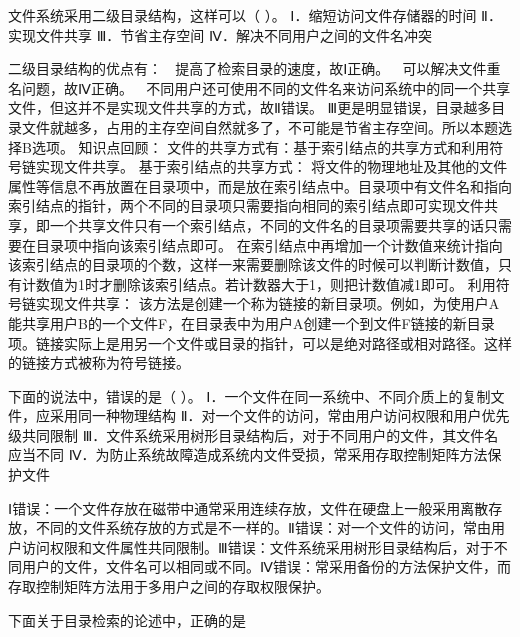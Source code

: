 \question 文件系统采用二级目录结构，这样可以（ ）。 Ⅰ．缩短访问文件存储器的时间
Ⅱ．实现文件共享 Ⅲ．节省主存空间 Ⅳ．解决不同用户之间的文件名冲突
\par{}
\begin{solution}二级目录结构的优点有：  提高了检索目录的速度，故Ⅰ正确。 
可以解决文件重名问题，故Ⅳ正确。 
不同用户还可使用不同的文件名来访问系统中的同一个共享文件，但这并不是实现文件共享的方式，故Ⅱ错误。
Ⅲ更是明显错误，目录越多目录文件就越多，占用的主存空间自然就多了，不可能是节省主存空间。所以本题选择B选项。
知识点回顾：
文件的共享方式有：基于索引结点的共享方式和利用符号链实现文件共享。
基于索引结点的共享方式：
将文件的物理地址及其他的文件属性等信息不再放置在目录项中，而是放在索引结点中。目录项中有文件名和指向索引结点的指针，两个不同的目录项只需要指向相同的索引结点即可实现文件共享，即一个共享文件只有一个索引结点，不同的文件名的目录项需要共享的话只需要在目录项中指向该索引结点即可。
在索引结点中再增加一个计数值来统计指向该索引结点的目录项的个数，这样一来需要删除该文件的时候可以判断计数值，只有计数值为1时才删除该索引结点。若计数器大于1，则把计数值减1即可。
利用符号链实现文件共享：
该方法是创建一个称为链接的新目录项。例如，为使用户A能共享用户B的一个文件F，在目录表中为用户A创建一个到文件F链接的新目录项。链接实际上是用另一个文件或目录的指针，可以是绝对路径或相对路径。这样的链接方式被称为符号链接。
\end{solution}
\question 下面的说法中，错误的是（ ）。
Ⅰ．一个文件在同一系统中、不同介质上的复制文件，应采用同一种物理结构
Ⅱ．对一个文件的访问，常由用户访问权限和用户优先级共同限制
Ⅲ．文件系统采用树形目录结构后，对于不同用户的文件，其文件名应当不同
Ⅳ．为防止系统故障造成系统内文件受损，常采用存取控制矩阵方法保护文件
\par{}
\begin{solution}Ⅰ错误：一个文件存放在磁带中通常采用连续存放，文件在硬盘上一般采用离散存放，不同的文件系统存放的方式是不一样的。Ⅱ错误：对一个文件的访问，常由用户访问权限和文件属性共同限制。Ⅲ错误：文件系统采用树形目录结构后，对于不同用户的文件，文件名可以相同或不同。Ⅳ错误：常采用备份的方法保护文件，而存取控制矩阵方法用于多用户之间的存取权限保护。
\end{solution}
\question 下面关于目录检索的论述中，正确的是
\par{}
